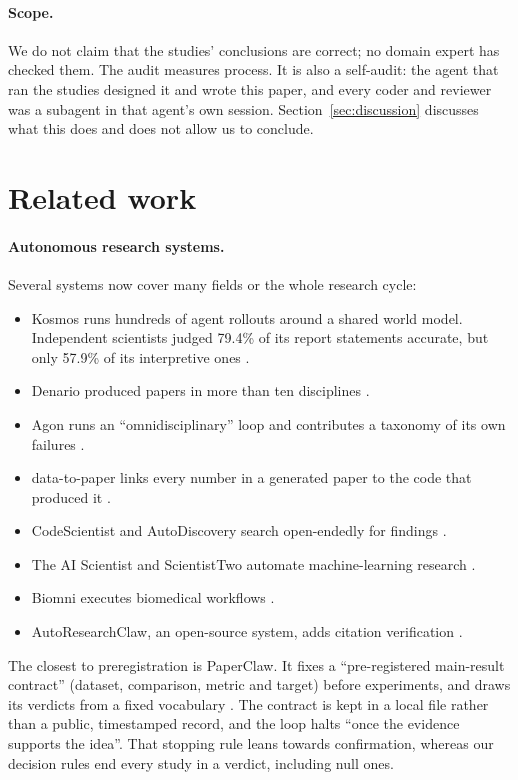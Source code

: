 \documentclass[11pt]{article}
\begin{document}
\paragraph{Scope.} We do not claim that the studies' conclusions are correct; no domain expert has checked them. The
audit measures process. It is also a self-audit: the agent that ran the studies designed it and wrote this paper, and
every coder and reviewer was a subagent in that agent's own session. Section~\ref{sec:discussion} discusses what this
does and does not allow us to conclude.

\section{Related work}

\paragraph{Autonomous research systems.} Several systems now cover many fields or the whole research cycle:
\begin{itemize}
\item Kosmos runs hundreds of agent rollouts around a shared world model. Independent scientists judged 79.4\% of its
report statements accurate, but only 57.9\% of its interpretive ones \citep{kosmos2025}.
\item Denario produced papers in more than ten disciplines \citep{denario2025}.
\item Agon runs an ``omnidisciplinary'' loop and contributes a taxonomy of its own failures \citep{agon2026}.
\item data-to-paper links every number in a generated paper to the code that produced it
\citep{ifargan2025datatopaper}.
\item CodeScientist and AutoDiscovery search open-endedly for findings \citep{codescientist2025,autods2025}.
\item The AI Scientist and ScientistTwo automate machine-learning research
\citep{lu2026nature,yamada2025aiscientistv2,scientisttwo2026}.
\item Biomni executes biomedical workflows \citep{biomni2026}.
\item AutoResearchClaw, an open-source system, adds citation verification \citep{autoresearchclaw2026}.
\end{itemize}

The closest to preregistration is PaperClaw. It fixes a ``pre-registered main-result contract'' (dataset, comparison,
metric and target) before experiments, and draws its verdicts from a fixed vocabulary \citep{paperclaw2026}. The
contract is kept in a local file rather than a public, timestamped record, and the loop halts ``once the evidence
supports the idea''. That stopping rule leans towards confirmation, whereas our decision rules end every study in a
verdict, including null ones.
\end{document}
